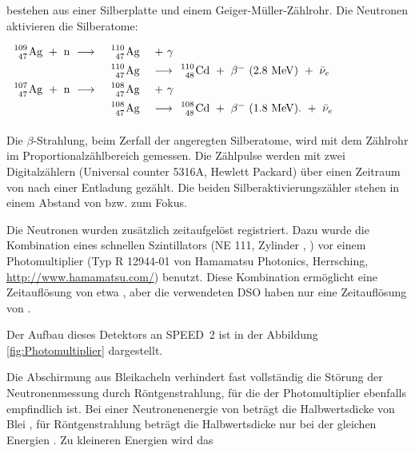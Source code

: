 bestehen aus einer Silberplatte und einem
Geiger-Müller-Zählrohr\cite{steinmetz:80}. Die Neutronen aktivieren die Silberatome:
\par
$\begin{array}{rcl}
  {109 \atop \hfill 47}{\rm Ag} \ +\ \rm n \ \longrightarrow \
  &{110 \atop \hfill 47}{\rm Ag}& \ +\ \gamma \\[1.5mm]

  &{110 \atop \hfill 47}{\rm Ag}& \ \longrightarrow \
  {110 \atop \hfill 48}{\rm Cd}
  \ +\ \beta^- \ (2.8 {\rm\  MeV}) \ +\ \bar\nu_e \\[1.5mm]

  \rm {107 \atop \hfill 47}{\rm Ag} \ +\ {\rm n} \ \longrightarrow \
  &{108 \atop \hfill 47}{\rm Ag}& \ +\ \gamma \\[1.5mm]

  &{108 \atop \hfill 47}{\rm Ag}& \ \longrightarrow \
  {108 \atop \hfill 48}{\rm Cd}
  \ +\ \beta^- \ (1.8 {\rm\ MeV}). \ +\ \bar\nu_e \\[1.5mm]
\end{array}$
\par
Die $\beta$-Strahlung, beim Zerfall der angeregten Silberatome, wird
mit dem Zählrohr im Proportionalzählbereich gemessen. Die Zählpulse
werden mit zwei Digitalzählern (Universal counter 5316A, Hewlett
Packard) über einen Zeitraum von  nach einer Entladung
gezählt. Die beiden Silberaktivierungszähler stehen in einem Abstand
von \wert{2.5}{m} bzw. \wert{9}{m} zum Fokus.
\par
Die Neutronen wurden zusätzlich zeitaufgelöst registriert. Dazu
wurde die Kombination eines schnellen Szintillators (NE 111,
Zylinder \wert{r = 2.5}{cm}, ) vor einem
Photomultiplier (Typ R 12944-01 von Hamamatsu Photonics,
Herrsching, \url{http://www.hamamatsu.com/}) benutzt. Diese
Kombination ermöglicht eine Zeitauflösung von etwa 
\cite{kies:phd}, aber die verwendeten DSO haben nur eine
Zeitauflösung von \wert{2.5}{ns}.
\par
Der Aufbau dieses Detektors an SPEED~2 ist in der Abbildung
\vref{fig:Photomultiplier} dargestellt.
\par
Die Abschirmung aus Bleikacheln verhindert fast vollständig die Störung
der Neutronenmessung durch Röntgenstrahlung, für die der
Photomultiplier ebenfalls empfindlich ist. Bei einer Neutronenenergie
von  beträgt die Halbwertsdicke von Blei , für
Röntgenstrahlung beträgt die Halbwertsdicke nur \wert{1}{cm} bei der
gleichen Energien \cite{dtv:70}. Zu kleineren Energien wird das
